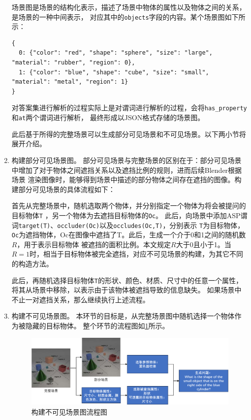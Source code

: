 \begin{enumerate}[nosep]
场景图是场景的结构化表示，描述了场景中物体的属性以及物体之间的关系，是场景的一种中间表示，
对应其中的\texttt{objects}字段的内容。某个场景图如下所示：
\begin{lstlisting}
{
  0: {"color": "red", "shape": "sphere", "size": "large", "material": "rubber", "region": 0},
  1: {"color": "blue", "shape": "cube", "size": "small", "material": "metal", "region": 1}
}
\end{lstlisting}

对答案集进行解析的过程实际上是对谓词进行解析的过程，会将\texttt{has\_property}和\texttt{at}两个谓词进行解析，
最终形成以JSON格式存储的场景图。

此后基于所得的完整场景可以生成部分可见场景和不可见场景。以下两小节将展开介绍。
\item 构建部分可见场景图。
部分可见场景与完整场景的区别在于：部分可见场景中增加了对于物体之间遮挡关系以及遮挡比例的规则，进而后续Blender根据场景
渲染图像时，能够得到场景中描述的部分物体之间存在遮挡的图像。构建部分可见场景的具体流程如下：

首先从完整场景中，随机选取两个物体，并分别指定一个物体为将会被提问的目标物体\texttt{T}
，另一个物体为去遮挡目标物体的\texttt{Oc}。
此后，向场景中添加ASP谓词\texttt{target(T)}、\texttt{occluder(Oc)}以及\texttt{occludes(Oc,T)}，分别表示
\texttt{T}为目标物体，\texttt{Oc}为遮挡物体，Oc在图像中遮挡了T。此后，生成一个介于0和1之间的随机数$R$，用于表示目标物体
被遮挡的面积比例。本文规定$R$大于0且小于1。当$R=1$时，相当于目标物体被完全遮挡，对应不可见场景的构建，为其它不同的构造方法。

此后，再随机选择目标物体\texttt{T}的形状、颜色、材质、尺寸中的任意一个属性，将其从场景中移除，以表示由于该物体被遮挡导致的信息缺失。
如果场景中不止一对遮挡关系，那么继续执行上述流程。
\item 构建不可见场景图。
本环节的目标是，从完整场景图中随机选择一个物体作为被隐藏的目标物体。
整个环节的流程图如\ref{generate-partial-scenes-and-questions}所示。
\begin{figure}[h]
\centering
\includegraphics[scale=0.6]{figures/部分场景及问题生成-crop.pdf}
\caption{构建不可见场景图流程图}
\label{generate-partial-scenes-and-questions}
\end{figure}


\end{enumerate}
